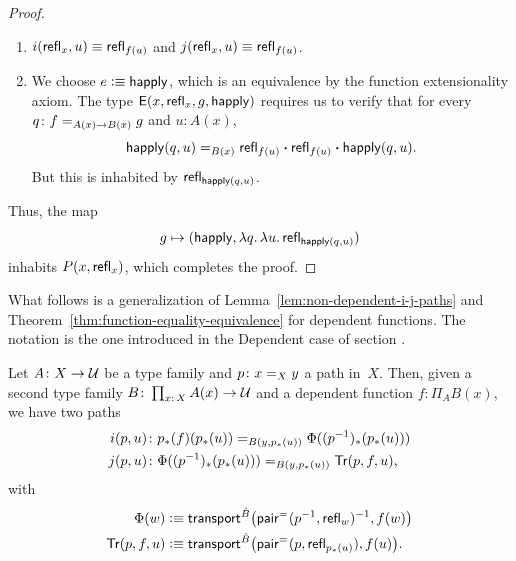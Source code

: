\begin{proof}
\begin{enumerate}[-]
        \item $i(\mathsf{refl}_x,u)\equiv\mathsf{refl}_{f(u)}$ and $j(\mathsf{refl}_x,u)\equiv\mathsf{refl}_{f(u)}$.

        \item We choose $e\mathrel{\vcentcolon}\equiv\mathsf{happly}$, which is an equivalence by the function extensionality axiom.
        The type $\mathsf{E}(x,\mathsf{refl}_x,g,\mathsf{happly})$ requires us to verify that for every $q\colon f\eq{A(x)\to B(x)}g$ and $u\colon A(x)$,
        \[
            \mathsf{happly}(q,u)
            \mathrel{=_{B(x)}}
            \mathsf{refl}_{f(u)}
                \mathbin{\boldsymbol{\cdot}} \mathsf{refl}_{f(u)}
                \mathbin{\boldsymbol{\cdot}}\mathsf{happly}(q,u).
        \]
        But this is inhabited by $\mathsf{refl}_{\mathsf{happly}(q,u)}$.
    \end{enumerate}
    Thus, the map
    \[
        g\mapsto(\mathsf{happly}
        ,\lambda q.\,\lambda u.\,\mathsf{refl}_{\mathsf{happly}(q,u)})
    \]
    inhabits $P(x,\mathsf{refl}_x)$, which completes the proof.
\end{proof}

What follows is a generalization of Lemma~\ref{lem:non-dependent-i-j-paths} and Theorem~\ref{thm:function-equality-equivalence} for dependent functions. The notation is the one introduced in the Dependent case of section .

\begin{lem}\label{lem:dependent-i-j-path}
    Let $A\colon X\to\univ$ be a type family and $p\colon x\eq Xy$ a path in~$X$. Then, given a second type family $B\colon\prod_{x\colon X}A(x)\to\univ$ and a dependent function $f\colon\Pi_AB(x)$, we have two paths
            \begin{align*}
                i(p,u)&\colon p_*(f)(p_*(u))
                    \eq{B(y,p_*(u))}\Phi((p^{-1})_*(p_*(u)))\\
                j(p,u)&\colon \Phi((p^{-1})_*(p_*(u)))
                    \eq{B(y,p_*(u))}\fun{Tr}(p,f,u),
            \end{align*}
            with
            \begin{align*}
                \Phi(w)&\mathrel{\vcentcolon}\equiv
                    \mathsf{transport}^{\hat B}
                    \bigl(\mathsf{pair}^{\mathrel{=_{}}}
                        (p^{-1},\mathsf{refl}_w)^{-1},f(w)
                    \bigr)\\
                \mathsf{Tr}(p,f,u)&\mathrel{\vcentcolon}\equiv
                    \mathsf{transport}^{\hat B}
                    \bigl(
                        \mathsf{pair}^{\mathrel{=_{}}}(p,\mathsf{refl}_{p_*(u)}),
                        f(u)
                    \bigr).
            \end{align*}
\end{lem}

